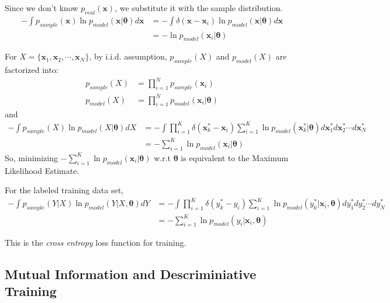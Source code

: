 \documentclass[a4]{article}
\begin{document}
Since we don't know $p_{real}(\bm{x})$, we substitute it with the
sample distribution.
\begin{equation}
\begin{aligned}
-\int p_{sample}(\bm{x}) \ln p_{model}(\bm{x}|\bm{\theta}) d\bm{x}
&= 
-\int \delta(\bm{x}-\bm{x}_i)\ln p_{model}(\bm{x}|\bm{\theta}) d\bm{x}\\
&= -\ln p_{model}(\bm{x}_i|\bm{\theta})
\end{aligned}
\end{equation}

For $X= \{\bm{x}_1, \bm{x}_2, \cdots, \bm{x}_N\}$, by i.i.d. assumption,
$p_{sample}(X)$ and $p_{model}(X)$ are factorized into:
\begin{equation}
\begin{aligned}
p_{sample}(X) &= \prod_{i=1}^N p_{sample}(\bm{x}_i)\\
p_{model}(X)  &= \prod_{i=1}^N p_{model}(\bm{x}_i|\bm{\theta})
\end{aligned}
\end{equation}
and
\begin{equation}
\begin{aligned}
- \int p_{sample}(X) \ln p_{model}(X|\bm{\theta}) dX
&= 
-\int \prod_{i=1}^K \delta(\bm{x}^*_k -\bm{x}_i)
\sum_{i=1}^K \ln p_{model}(\bm{x}^*_k|\bm{\theta})
d\bm{x}^*_1d\bm{x}^*_2\cdots d\bm{x}^*_N\\
&= -\sum_{i=1}^K \ln p_{model}(\bm{x}_i|\bm{\theta})
\end{aligned}
\end{equation}
So, minimizing $-\sum_{i=1}^K \ln p_{model}(\bm{x}_i|\bm{\theta})$ w.r.t 
$\bm{\theta}$ is equivalent to the Maximum Likelihood Estimate.

For the labeled training data set, 
\begin{equation}
\begin{aligned}
- \int p_{sample}(Y|X) \ln p_{model}( Y | X,\bm{\theta} ) dY
&= 
-\int \prod_{i=1}^K \delta(y^*_k - y_i)
\sum_{i=1}^K \ln p_{model}(y^*_k | \bm{x}_i, \bm{\theta})
dy^*_1dy^*_2\cdots dy^*_N\\
&= -\sum_{i=1}^K \ln p_{model}(y_i|\bm{x}_i, \bm{\theta})
\end{aligned}
\end{equation}

This is the \emph{cross entropy} loss function for training.

\subsection{Mutual Information and Descriminiative Training}
\end{document}
